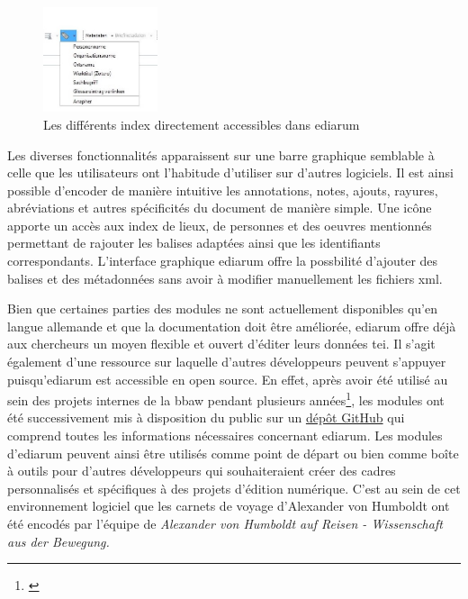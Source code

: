\documentclass[a4paper, 12pt, twoside]{book}
\begin{document}
\begin{figure}
\centering
\includegraphics[width=0.3\textwidth]{img/ediarum_register.jpg}
\caption{Les différents index directement accessibles dans ediarum }
\vspace{-10pt}
\end{figure}

Les diverses fonctionnalités apparaissent sur une barre graphique semblable à celle que les utilisateurs ont l'habitude d'utiliser sur d'autres logiciels. Il est ainsi possible d'encoder de manière intuitive les annotations, notes, ajouts, rayures, abréviations et autres spécificités du document de manière simple. Une icône apporte un accès aux index de lieux, de personnes et des oeuvres mentionnés permettant de rajouter les balises adaptées ainsi que les identifiants correspondants. L'interface graphique ediarum offre la possbilité d'ajouter des balises et des métadonnées sans avoir à modifier manuellement les fichiers \gls{xml}. 

Bien que certaines parties des modules ne sont actuellement disponibles qu'en langue allemande et que la documentation doit être améliorée, ediarum offre déjà aux chercheurs un moyen flexible et ouvert d'éditer leurs données \gls{tei}. Il s'agit également d'une ressource sur laquelle d'autres développeurs peuvent s'appuyer puisqu'ediarum est accessible en open source. En effet, après avoir été utilisé au sein des projets internes de la \gls{bbaw} pendant plusieurs années\footnote{\cite{noauthor_ediarum_nodate-1}}, les modules ont été successivement mis à disposition du public sur un \href{https://github.com/ediarum}{dépôt GitHub} qui comprend toutes les informations nécessaires concernant ediarum. Les modules d'ediarum peuvent ainsi être utilisés comme point de départ ou bien comme boîte à outils pour d'autres développeurs qui souhaiteraient créer des cadres personnalisés et spécifiques à des projets d'édition numérique. C'est au sein de cet environnement logiciel que les carnets de voyage d'Alexander von Humboldt ont été encodés par l'équipe de \textit{Alexander von Humboldt auf Reisen - Wissenschaft aus der Bewegung.}
\end{document}
